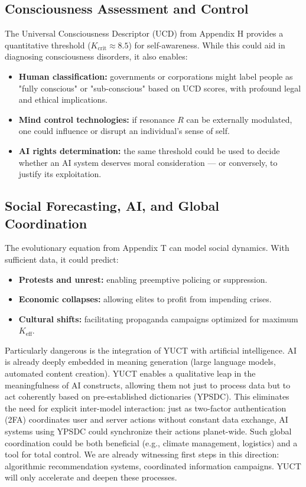 \documentclass[12pt,a4paper]{article}
\theoremstyle{remark}
\newcommand{\Keff}{K_{\mathrm{eff}}}
\newcommand{\Kcrit}{K_{\mathrm{crit}}}
\begin{document}
	\subsection{Consciousness Assessment and Control}
	\label{subsec:consciousness}
	
	The Universal Consciousness Descriptor (UCD) from Appendix H provides a quantitative threshold (\(\Kcrit \approx 8.5\)) for self-awareness. While this could aid in diagnosing consciousness disorders, it also enables:
	\begin{itemize}[leftmargin=*]
		\item \textbf{Human classification:} governments or corporations might label people as "fully conscious" or "sub-conscious" based on UCD scores, with profound legal and ethical implications.
		\item \textbf{Mind control technologies:} if resonance \(R\) can be externally modulated, one could influence or disrupt an individual's sense of self.
		\item \textbf{AI rights determination:} the same threshold could be used to decide whether an AI system deserves moral consideration — or conversely, to justify its exploitation.
	\end{itemize}
	
	\subsection{Social Forecasting, AI, and Global Coordination}
	\label{subsec:social}
	
	The evolutionary equation from Appendix T can model social dynamics. With sufficient data, it could predict:
	\begin{itemize}[leftmargin=*]
		\item \textbf{Protests and unrest:} enabling preemptive policing or suppression.
		\item \textbf{Economic collapses:} allowing elites to profit from impending crises.
		\item \textbf{Cultural shifts:} facilitating propaganda campaigns optimized for maximum \(\Keff\).
	\end{itemize}
	
	Particularly dangerous is the integration of YUCT with artificial intelligence. AI is already deeply embedded in meaning generation (large language models, automated content creation). YUCT enables a qualitative leap in the meaningfulness of AI constructs, allowing them not just to process data but to act coherently based on pre-established dictionaries (YPSDC). This eliminates the need for explicit inter-model interaction: just as two-factor authentication (2FA) coordinates user and server actions without constant data exchange, AI systems using YPSDC could synchronize their actions planet-wide. Such global coordination could be both beneficial (e.g., climate management, logistics) and a tool for total control. We are already witnessing first steps in this direction: algorithmic recommendation systems, coordinated information campaigns. YUCT will only accelerate and deepen these processes.
	
\end{document}
